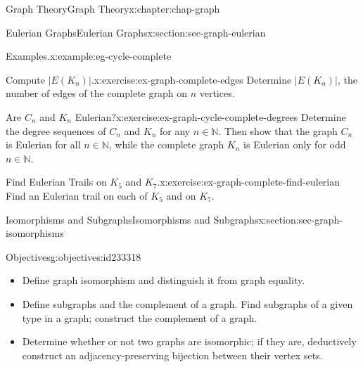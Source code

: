 \documentclass[oneside,10pt,]{book}
\numberwithin{equation}{section}
\begin{document}
\begin{chapterptx}{Graph Theory}{}{Graph Theory}{}{}{x:chapter:chap-graph}
\begin{sectionptx}{Eulerian Graphs}{}{Eulerian Graphs}{}{}{x:section:sec-graph-eulerian}
\begin{example}{Examples.}{x:example:eg-cycle-complete}
\begin{sidebyside}{4}{0.035}{0.035}{0.07}
\begin{sbspanel}{0.2}
{
}%
\end{sbspanel}%
\end{sidebyside}%
\end{example}
\begin{inlineexercise}{Compute \(|E(K_n)|\).}{x:exercise:ex-graph-complete-edges}%
Determine \(|E(K_n)|\), the number of edges of the complete graph on \(n\) vertices.%
\end{inlineexercise}
\begin{inlineexercise}{Are \(C_n\) and \(K_n\) Eulerian?}{x:exercise:ex-graph-cycle-complete-degrees}%
Determine the degree sequences of \(C_n\) and \(K_n\) for any \(n \in \mathbb{N}\). Then show that the graph \(C_n\) is Eulerian for all \(n \in \mathbb{N}\), while the complete graph \(K_n\) is Eulerian only for odd \(n \in \mathbb{N}\).%
\end{inlineexercise}
\begin{inlineexercise}{Find Eulerian Trails on \(K_5\) and \(K_7\).}{x:exercise:ex-graph-complete-find-eulerian}%
Find an Eulerian trail on each of \(K_5\) and on \(K_7\).%
\end{inlineexercise}
\end{sectionptx}
%
%
\typeout{************************************************}
\typeout{************************************************}
%
\begin{sectionptx}{Isomorphisms and Subgraphs}{}{Isomorphisms and Subgraphs}{}{}{x:section:sec-graph-isomorphisms}
\begin{objectives}{Objectives}{g:objectives:id233318}
%
\begin{itemize}[label=\textbullet]
\item{}Define graph isomorphism and distinguish it from graph equality.%
\item{}Define subgraphs and the complement of a graph. Find subgraphs of a given type in a graph; construct the complement of a graph.%
\item{}Determine whether or not two graphs are isomorphic; if they are, deductively construct an adjacency-preserving bijection between their vertex sets.%

\end{itemize}
\end{objectives}
\end{sectionptx}
\end{chapterptx}
\end{document}
